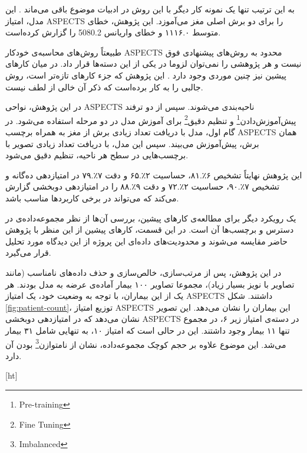 به این ترتیب تنها یک نمونه کار دیگر با این روش در ادبیات موضوع باقی می‌ماند \cite{jung2018evaluating}.
این مدل، امتیاز ASPECTS را برای دو برش اصلی مغز می‌آموزد.
این پژوهش، خطای متوسط ۱۱۱۶.۰ و خطای واریانس 5080.2 را گزارش کرده‌است.

طبیعتاً روش‌های محاسبه‌ی خودکار ASPECTS محدود به روش‌های پیشنهادی فوق نیست
و هر پژوهشی را نمی‌توان لزوما در یکی از این دسته‌ها قرار داد.
در میان کارهای پیشین نیز چنین موردی وجود دارد \cite{chen2022improving}.
این پژوهش که جزء کار‌های تازه‌تر است، روش جالبی را به کار برده‌است که ذکر آن خالی از لطف نیست.

در این پژوهش، نواحی ASPECTS ناحیه‌بندی می‌شوند.
سپس از دو ترفند 
پیش‌آموزش‌دادن\footnote{Pre-training}
و 
تنظیم دقیق\footnote{Fine Tuning}
برای آموزش مدل در دو مرحله استفاده می‌شود.
در گام اول، مدل با دریافت تعداد زیادی برش از مغز به همراه برچسب ASPECTS همان برش، پیش‌آموزش می‌بیند.
سپس این مدل، با دریافت تعداد زیادی تصویر با برچسب‌هایی در سطح هر ناحیه، تنظیم دقیق می‌شود.

این پژوهش نهایتاً تشخیص
۶٪.۸۱،
حساسیت
۲٪.۶۵
و دقت 
۷٪.۷۹
در امتیازدهی ده‌گانه و 
تشخیص
۷٪.۹۰،
حساسیت
۲٪.۷۲
و دقت 
۹٪.۸۸
را
در امتیازدهی دوبخشی 
گزارش می‌کند که می‌تواند در برخی کاربرد‌ها مناسب باشد.

یک رویکرد دیگر برای مطالعه‌ی کارهای پیشین، بررسی آن‌ها از نظر مجموعه‌داده‌ی در دسترس و برچسب‌ها آن است.
در این قسمت، کارهای پیشین از این منظر با پژوهش حاضر مقایسه می‌شوند
و
محدودیت‌های داده‌ای این پروژه از این دیدگاه مورد تحلیل قرار می‌گیرد.

در این پژوهش، پس از مرتب‌سازی، خالص‌سازی و حذف داده‌های نامناسب (مانند تصاویر با نویز بسیار زیاد)، مجموعا تصاویر ۱۰۰ بیمار آماده‌ی عرضه به مدل بودند.
هر یک از این بیماران، با توجه به وضعیت خود، یک امتیاز ASPECTS داشتند.
شکل \ref{fig:patient-count}، توزیع امتیاز ASPECTS این بیماران را نشان می‌دهد.
این تصویر نشان می‌دهد که در امتیازدهی دوبخشی ASPECTS در دسته‌ی امتیاز زیر ۶، در مجموع تنها ۱۱ بیمار وجود داشتند.
این در حالی است که امتیاز ۱۰، به تنهایی شامل ۳۱ بیمار می‌شد.
این موضوع علاوه بر حجم کوچک مجموعه‌داده، نشان از 
نامتوازن\footnote{Imbalanced} 
بودن آن دارد.


[ht]

